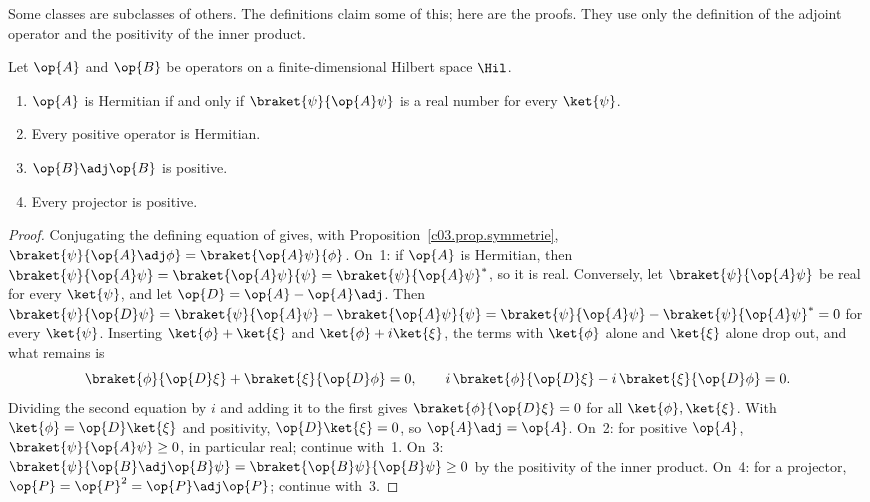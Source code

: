 Some classes are subclasses of others. The definitions claim some of this; here are the proofs.
They use only the definition of the adjoint operator and the positivity of the inner product.

\begin{proposition}\label{c03.prop.positiv}
  Let $\op{A}$ and $\op{B}$ be operators on a finite-dimensional Hilbert space $\Hil$.
  \begin{enumerate}
    \item $\op{A}$ is Hermitian if and only if $\braket{\psi}{\op{A}\psi}$ is a real number for
      every $\ket{\psi}$.
    \item Every positive operator is Hermitian.
    \item $\op{B}\adj\op{B}$ is positive.
    \item Every projector is positive.
  \end{enumerate}
\end{proposition}
\begin{proof}
  Conjugating the defining equation of  gives, with
  Proposition~\ref{c03.prop.symmetrie}, $\braket{\psi}{\op{A}\adj\phi} = \braket{\op{A}\psi}{\phi}$.
  On~1: if $\op{A}$ is Hermitian, then
  $\braket{\psi}{\op{A}\psi} = \braket{\op{A}\psi}{\psi} = \braket{\psi}{\op{A}\psi}^*$, so it
  is real. Conversely, let $\braket{\psi}{\op{A}\psi}$ be real for every $\ket{\psi}$, and let
  $\op{D} = \op{A} - \op{A}\adj$. Then
  $\braket{\psi}{\op{D}\psi} = \braket{\psi}{\op{A}\psi} - \braket{\op{A}\psi}{\psi} = \braket{\psi}{\op{A}\psi} - \braket{\psi}{\op{A}\psi}^* = 0$
  for every $\ket{\psi}$. Inserting $\ket{\phi} + \ket{\xi}$ and $\ket{\phi} + i\ket{\xi}$,
  the terms with $\ket{\phi}$ alone and $\ket{\xi}$ alone drop out, and what remains is
  \begin{equation}\label{c03.eq.polarisation}
    \braket{\phi}{\op{D}\xi} + \braket{\xi}{\op{D}\phi} = 0 ,
    \qquad
    i\, \braket{\phi}{\op{D}\xi} - i\, \braket{\xi}{\op{D}\phi} = 0 .
  \end{equation}
  Dividing the second equation by $i$ and adding it to the first gives
  $\braket{\phi}{\op{D}\xi} = 0$ for all $\ket{\phi}, \ket{\xi}$. With
  $\ket{\phi} = \op{D}\ket{\xi}$ and positivity, $\op{D}\ket{\xi} = 0$, so
  $\op{A}\adj = \op{A}$. On~2: for positive $\op{A}$, $\braket{\psi}{\op{A}\psi} \geq 0$, in
  particular real; continue with~1. On~3:
  $\braket{\psi}{\op{B}\adj\op{B}\psi} = \braket{\op{B}\psi}{\op{B}\psi} \geq 0$ by the
  positivity of the inner product. On~4: for a projector,
  $\op{P} = \op{P}^2 = \op{P}\adj\op{P}$; continue with~3.
\end{proof}

